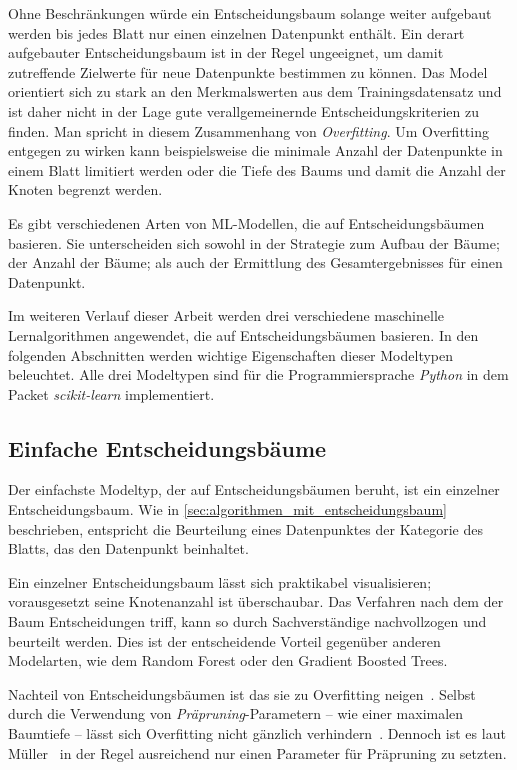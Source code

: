 Ohne Beschränkungen würde ein Entscheidungsbaum solange weiter aufgebaut werden bis jedes Blatt nur einen einzelnen Datenpunkt enthält. Ein derart aufgebauter Entscheidungsbaum ist in der Regel ungeeignet, um damit zutreffende Zielwerte für neue Datenpunkte bestimmen zu können. Das Model orientiert sich zu stark an den Merkmalswerten aus dem Trainingsdatensatz und ist daher nicht in der Lage gute verallgemeinernde Entscheidungskriterien zu finden. Man spricht in diesem Zusammenhang von \textit{Overfitting}. Um Overfitting entgegen zu wirken kann beispielsweise die minimale Anzahl der Datenpunkte in einem Blatt limitiert werden oder die Tiefe des Baums und damit die Anzahl der Knoten begrenzt werden.

Es gibt verschiedenen Arten von ML-Modellen, die auf Entscheidungsbäumen basieren. Sie unterscheiden sich sowohl in der Strategie zum Aufbau der Bäume; der Anzahl der Bäume; als auch der Ermittlung des Gesamtergebnisses für einen Datenpunkt. 

Im weiteren Verlauf dieser Arbeit werden drei verschiedene maschinelle Lernalgorithmen angewendet, die auf Entscheidungsbäumen basieren. In den folgenden Abschnitten werden wichtige Eigenschaften dieser Modeltypen beleuchtet. Alle drei Modeltypen sind für die Programmiersprache \textit{Python} in dem Packet \textit{scikit-learn} implementiert.
\subsection{Einfache Entscheidungsbäume}
\label{sec:einfache_entscheidungsbaeume}
Der einfachste Modeltyp, der auf Entscheidungsbäumen beruht, ist ein einzelner Entscheidungsbaum. Wie in \cref{sec:algorithmen_mit_entscheidungsbaum} beschrieben, entspricht die Beurteilung eines Datenpunktes der Kategorie des Blatts, das den Datenpunkt beinhaltet.

Ein einzelner Entscheidungsbaum lässt sich praktikabel visualisieren; vorausgesetzt seine Knotenanzahl ist überschaubar. Das Verfahren nach dem der Baum Entscheidungen triff, kann so durch Sachverständige nachvollzogen und beurteilt werden. Dies ist der entscheidende Vorteil gegenüber anderen Modelarten, wie dem Random Forest oder den Gradient Boosted Trees.

Nachteil von Entscheidungsbäumen ist das sie zu Overfitting neigen~\cite[S.~80]{Muller.2017}. Selbst durch die Verwendung von \textit{Präpruning}-Parametern -- wie einer maximalen Baumtiefe -- lässt sich Overfitting nicht gänzlich verhindern~\cite[S.~80]{Muller.2017}. Dennoch ist es laut Müller~\cite[S.~79]{Muller.2017} in der Regel ausreichend nur einen Parameter für Präpruning zu setzten.
